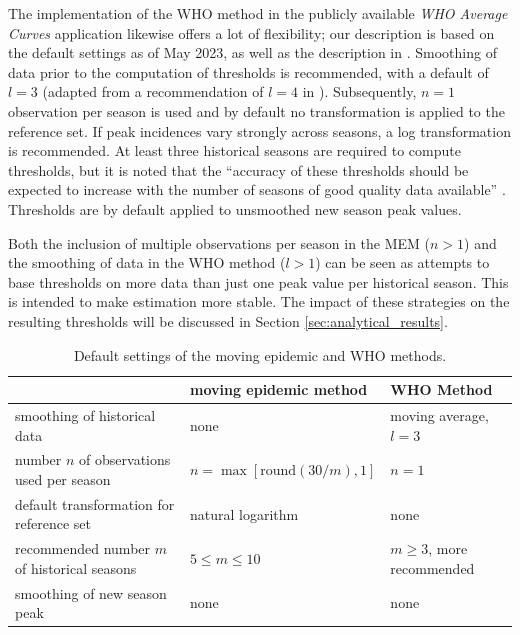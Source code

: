 \documentclass{article}
\begin{document}
The implementation of the WHO method in the publicly available \textit{WHO Average Curves} application \citep{WHO2023} likewise offers a lot of flexibility; our description is based on the default settings as of May 2023, as well as the description in \cite{WHO2014}. Smoothing of data prior to the computation of thresholds is recommended, with a default of $l = 3$ (adapted from a recommendation of $l = 4$ in \citealt[p68]{WHO2014}). Subsequently, $n = 1$ observation per season is used and by default no transformation is applied to the reference set. If peak incidences vary strongly across seasons, a log transformation is recommended. At least three historical seasons are required to compute thresholds, but it is noted that the ``accuracy of these thresholds should be expected to increase with the number of seasons of good quality data available'' \cite[p22]{WHO2023}. Thresholds are by default applied to unsmoothed new season peak values.

Both the inclusion of multiple observations per season in the MEM ($n > 1$) and the smoothing of data in the WHO method ($l > 1$) can be seen as attempts to base thresholds on more data than just one peak value per historical season. This is intended to make estimation more stable. The impact of these strategies on the resulting thresholds will be discussed in Section \ref{sec:analytical_results}.




\begin{table}[h]
\caption{Default settings of the moving epidemic and WHO methods.}
\label{tab:differences}
\begin{center}
\footnotesize
\begin{tabular}{lll}
\toprule
& moving epidemic method & WHO Method \\
\midrule
smoothing of historical data & none & moving average, $l = 3$\\
number $n$ of observations used per season & $n = \max[\text{round}(30/m), 1]$ & $n = 1$\\
default transformation for reference set & natural logarithm & none\\
recommended number $m$ of historical seasons & $5 \leq m \leq 10$ & $m \geq 3$, more recommended\\
smoothing of new season peak & none & none\\
\bottomrule
\end{tabular}
\end{center}

\end{table}
\end{document}
